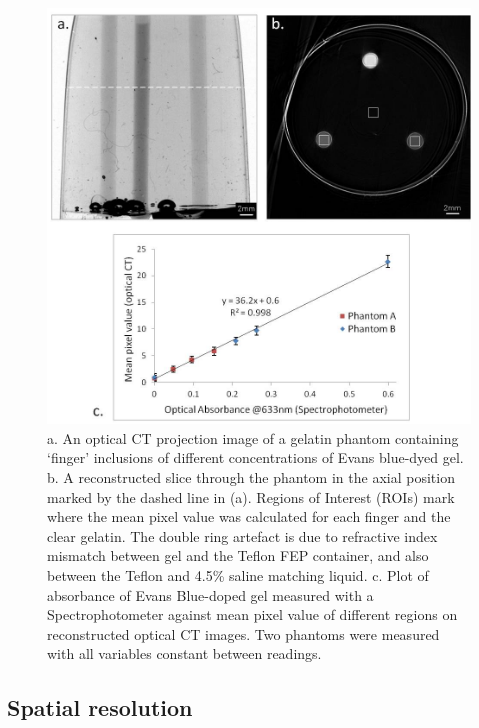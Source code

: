 	\begin{figure}[H]
		\centering
		\includegraphics[width=1\textwidth]{meth_img/EB_rod_new.jpg}
		\caption{a. An optical CT projection image of a gelatin phantom containing `finger' inclusions of different concentrations of Evans blue-dyed gel. b. A reconstructed slice through the phantom in the axial position marked by the dashed line in (a). Regions of Interest (ROIs) mark where the mean pixel value was calculated for each finger and the clear gelatin. The double ring artefact is due to refractive index mismatch between gel and the Teflon FEP container, and also between the Teflon and 4.5\% saline matching liquid. c. Plot of absorbance of Evans Blue-doped gel measured with a Spectrophotometer against mean pixel value of different regions on reconstructed optical CT images. Two phantoms were measured  with all  variables constant between readings.}
		\label{fig:fingerphantoms_roi_EB}
	\end{figure}
	








\subsection{Spatial resolution}
\label{subsec:spat_res}


